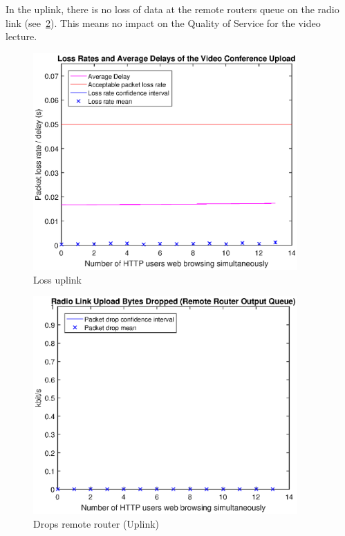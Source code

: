 \documentclass[a4paper,10pt]{book}\usepackage{graphicx}
\begin{document}
In the uplink, there is no loss of data at the remote routers queue on the radio link (see~\ref{fig:remoteRdrops}).
This means no impact on the Quality of Service for the video lecture.
\begin{figure}[!ht]
  \begin{center}
  \includegraphics[width=0.9\textwidth]{off_loss_conf_upload.eps}
    \caption{Loss uplink}
     \label{fig:losslecup}
     \end{center}
\end{figure}

\begin{figure}[!ht]
  \begin{center}
    \includegraphics[width=0.9\textwidth]{on_remote_router_drops.eps}
    \caption{Drops remote router (Uplink)}
     \label{fig:remoteRdrops}
     \end{center}
\end{figure}
\end{document}
